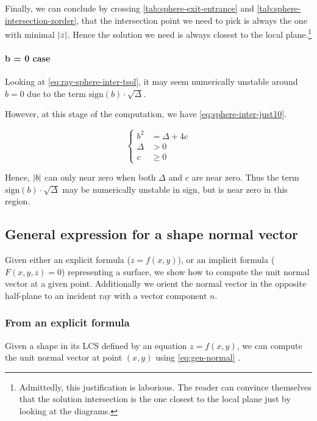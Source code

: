Finally, we can conclude by crossing \cref{tab:sphere-exit-entrance}
and \cref{tab:sphere-intersection-zorder}, that the intersection point
we need to pick is always the one with minimal $\abs{z}$. Hence the
solution we need is always closest to the local plane.\footnote{Admittedly,
this justification is laborious. The reader can convince themselves
that the solution intersection is the one closest to the local plane just
by looking at the diagrams.}

\paragraph{b = 0 case}
Looking at \cref{eq:ray-sphere-inter-tsol}, it may seem numerically
unstable around $b = 0$ due to the term $\textrm{sign}(b) \cdot \sqrt{\Delta}$.

However, at this stage of the computation, we have
\cref{eq:sphere-inter-just10}.

\begin{equation} \label{eq:sphere-inter-just10} \begin{cases}
b^2 &= \Delta + 4 c \\
\Delta &> 0 \\
c &\geq 0
\end{cases} \end{equation}

Hence, $\abs{b}$ can only near zero when both $\Delta$ and $c$ are near zero.
Thus the term $\textrm{sign}(b) \cdot \sqrt{\Delta}$ may be numerically
unstable in sign, but is near zero in this region.

\subsection{General expression for a shape normal vector}
Given either an explicit formula ($z = f(x, y)$), or an implicit
formula ($F(x, y, z) = 0$) representing a surface, we show how
to compute the unit normal vector at a given point. Additionally
we orient the normal vector in the opposite half-plane to an incident
ray with a vector component $n$.

\subsubsection{From an explicit formula}
Given a shape in its \gls{LCS} defined by an equation $z = f(x, y)$,
we can compute the unit normal vector at point $(x, y)$ using
\cref{eq:gen-normal} \cite{mathworld:normal-vector}. 

